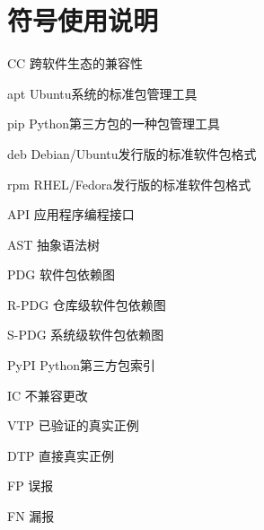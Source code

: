 \chapter*{符号使用说明}

\begin{denotation}
\item[CC]	跨软件生态的兼容性
\item[apt]	Ubuntu系统的标准包管理工具
\item[pip]	Python第三方包的一种包管理工具
\item[deb] Debian/Ubuntu发行版的标准软件包格式
\item[rpm] RHEL/Fedora发行版的标准软件包格式
\item[API] 应用程序编程接口
\item[AST]	抽象语法树
\item[PDG]	软件包依赖图
\item[R-PDG]	仓库级软件包依赖图
\item[S-PDG]	系统级软件包依赖图
\item[PyPI]	Python第三方包索引
\item[IC]	不兼容更改
\item[VTP] 已验证的真实正例
\item[DTP] 直接真实正例
\item[FP] 误报
\item[FN] 漏报

\end{denotation}

